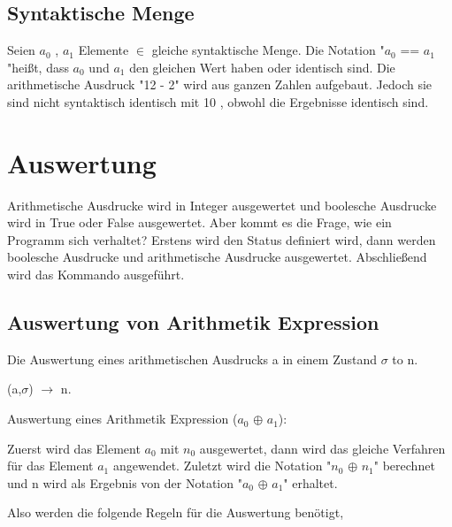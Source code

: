 \documentclass[a4paper,12pt,twoside,headsepline]{scrartcl}
\begin{document}
\subsection{Syntaktische Menge }
Seien $a_0$ , $a_1$ Elemente  $\in$ gleiche syntaktische Menge. Die Notation "$a_0$ == $a_1$"heißt, dass $a_0$ und $a_1$ den gleichen Wert haben oder identisch sind. 
Die  arithmetische Ausdruck "12 - 2"  wird aus ganzen Zahlen aufgebaut. Jedoch sie sind nicht syntaktisch identisch mit 10 , obwohl die Ergebnisse identisch sind.

\section{Auswertung}
Arithmetische Ausdrucke wird in Integer ausgewertet und boolesche Ausdrucke wird in True oder False  ausgewertet. Aber kommt es die Frage, wie ein Programm sich verhaltet?
Erstens wird den Status definiert wird, dann werden boolesche Ausdrucke und arithmetische Ausdrucke ausgewertet. Abschließend wird das Kommando ausgeführt.

\subsection{Auswertung von Arithmetik Expression}
Die Auswertung eines arithmetischen Ausdrucks a in einem Zustand  $\sigma$ to n.

\begin{center}  (a,$\sigma$) $\to$ n.    
\end{center}
                      
Auswertung eines Arithmetik Expression  ($a_0$ $\oplus$ $a_1$):

Zuerst wird das Element $a_0$  mit $n_0$ ausgewertet, dann wird das gleiche Verfahren für das Element $a_1$ angewendet.
Zuletzt wird die Notation "$n_0$ $\oplus$ $n_1$"  berechnet und n wird als Ergebnis von der Notation "$a_0$ $\oplus$ $a_1$" erhaltet.

Also werden die folgende Regeln für die Auswertung benötigt,
\end{document}
